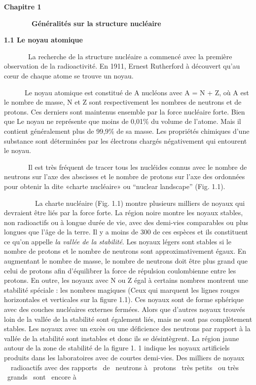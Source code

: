 \documentclass[a4paper]{article}
\begin{document}
\bigskip


\bigskip


\bigskip

\clearpage
\bigskip

\textbf{Chapitre 1}


\bigskip

\ \ \ \ \ \ \ \ \textbf{Généralités sur la structure nucléaire}


\bigskip

\textbf{1.1 Le noyau atomique}

\ \ \ \ \ \ \ La recherche de la structure nucléaire a commencé avec la première observation de la radioactivité. En
1911, Ernest Rutherford à découvert qu'au cœur de chaque atome se trouve un noyau.

\ \ \ \ \ \ Le noyau atomique est constitué de A nucléons avec A = N + Z, où A est le nombre de masse, N et Z sont
respectivement les nombres de neutrons et de protons. Ces derniers sont maintenus ensemble par la force nucléaire
forte. Bien que Le noyau ne représente que moins de 0,01\% du volume de l'atome. Mais il contient généralement plus de
99,9\% de sa masse. Les propriétés chimiques d'une substance sont déterminées par les électrons chargés négativement
qui entourent le noyau.

\ \ \ \ \ \ \ Il est très fréquent de tracer tous les nucléides connus avec le nombre de neutrons sur l’axe des
abscisses et le nombre de protons sur l’axe des ordonnées pour obtenir la dite «charte nucléaire» ou “nuclear
landscape” (Fig. 1.1).

\ \ \ \ \ \ \ \ \ La charte nucléaire (Fig. 1.1) montre plusieurs milliers de noyaux qui devraient être liés par la
force forte. La région noire montre les noyaux stables, non radioactifs ou à longue durée de vie, avec des demi-vies
comparables ou plus longues que l’âge de la terre. Il y a moins de 300 de ces espèces et ils constituent ce qu’on
appelle {\textquotedbl}\textit{la vallée de la stabilité}{\textquotedbl}. Les noyaux légers sont stables si le nombre
de protons et le nombre de neutrons sont approximativement égaux. En augmentant le nombre de masse, le nombre de
neutrons doit être plus grand que celui de protons afin d’équilibrer la force de répulsion coulombienne entre les
protons. En outre, les noyaux avec N ou Z égal à certains nombres montrent une stabilité spéciale : les nombres
magiques (Ceux qui marquent les lignes rouges horizontales et verticales sur la figure 1.1). Ces noyaux sont de forme
sphérique avec des couches nucléaires externes fermées. Alors que d’autres noyaux trouvés loin de la vallée de la
stabilité sont également liés, mais ne sont pas complètement stables. Les noyaux avec un excès ou une déficience des
neutrons par rapport à la vallée de la stabilité sont instables et donc ils se désintègrent. La région jaune autour de
la zone de stabilité de la figure 1. 1 indique les noyaux artificiels produits dans les laboratoires avec de courtes
demi-vies. Des milliers de noyaux \ \ radioactifs avec des rapports \ de \ neutrons à \ protons \ très petits \ ou très
\ grands \ sont \ encore à 
\end{document}
